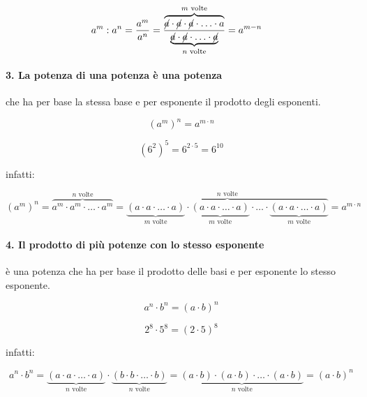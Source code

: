 \begin{align*}
 a^m: a^n &= \frac{a^m}{a^n}=
 \frac{\overbrace{\cancel{a} \cdot \cancel{a} \cdot \cancel{a} \cdot 
                  \ldots \cdot a}^{m \text{ volte}}}
 {\underbrace{\cancel{a} \cdot \cancel{a} \cdot
                  \ldots \cdot \cancel{a}}_{n \text{ volte}}}=
 a^{m-n}
\end{align*}
\vspace{-1em}
\paragraph{3. La potenza di una potenza è una potenza} 
che ha per base la stessa base e per esponente il prodotto degli esponenti.

\begin{minipage}[h]{.35\textwidth}
\vspace{4.5mm}
\[\boxed{(a^m)^n=a^{m \cdot n}}\]
\end{minipage}\hfil
\begin{minipage}[h]{.35\textwidth}
\[(6^2)^5=6^{2\cdot 5}=6^{10}\]
\end{minipage}
\hfil
\begin{minipage}[c]{.25\textwidth}
\vspace{4.5mm}
\centering infatti:
\end{minipage}
\[ (a^m)^n =\overbrace{a^m\cdot a^m\cdot\ldots\cdot a^m}^{n\text{ volte}}%
 =\overbrace{\underbrace{(a\cdot a\cdot\ldots\cdot a)}_{m\text{ 
volte}}\cdot%
   \underbrace{(a\cdot a\cdot\ldots\cdot a)}_{m\text{ 
volte}}\cdot\ldots\cdot%
   \underbrace{(a\cdot a\cdot\ldots\cdot a)}_{m\text{ 
volte}}}^{n\text{ volte}}%
   =a^{m\cdot n}\]
\vspace{-1.5em}
\paragraph{4. Il prodotto di più potenze con lo stesso esponente} 
è una potenza che ha per base il prodotto delle basi e per esponente lo stesso
esponente.

\begin{minipage}[h]{.35\textwidth}
\vspace{4.5mm}
\[\boxed{a^n\cdot b^n=(a\cdot b)^n}\]
\end{minipage}\hfil
\begin{minipage}[h]{.35\textwidth}
\[2^8\cdot 5^8=(2\cdot 5)^8\]
\end{minipage}
\hfil
\begin{minipage}[c]{.25\textwidth}
\vspace{4.5mm}
\centering infatti:
\end{minipage}
\[a^n \cdot b^n=
  \underbrace{(a\cdot a\cdot\ldots\cdot a)}_{n\text{ volte}}\cdot%
  \underbrace{(b\cdot b\cdot\ldots\cdot b)}_{n\text{ volte}}=
  \underbrace{(a\cdot b)\cdot(a\cdot b)\cdot\ldots\cdot
              (a\cdot b)}_{n\text{ volte}}=
   (a\cdot b)^n\]
\vspace{-1.5em}
